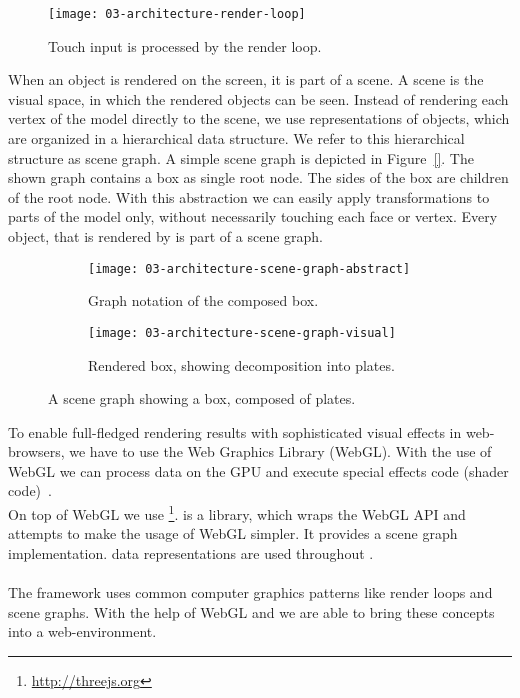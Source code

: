 \documentclass[../ClassicThesis.tex]{subfiles}
\begin{document}
\begin{figure}[h]
  \centering
  \texttt{[image: 03-architecture-render-loop]}
  \caption{Touch input is processed by the render loop.}
  \label{fig:render-loop}
\end{figure}

When an object is rendered on the screen, it is part of a scene. A
scene is the visual space, in which the rendered objects can be seen.
Instead of rendering each vertex of the model directly to the scene,
we use representations of objects, which are organized in a
hierarchical data structure. We refer to this hierarchical structure
as scene graph. A simple scene graph is depicted in Figure~\ref{}. The
shown graph contains a box as single root node. The sides of the box
are children of the root node. With this abstraction we can easily
apply transformations to parts of the model only, without necessarily
touching each face or vertex. Every object, that is rendered by
{\convertify} is part of a scene graph.

\begin{figure}[H]
  \centering
  \begin{subfigure}[b]{0.49\textwidth}
    \centering
    \texttt{[image: 03-architecture-scene-graph-abstract]}
    \caption{Graph notation of the composed box.}
    \label{fig:scene-graph:abstract}
  \end{subfigure}
  \begin{subfigure}[b]{0.49\textwidth}
    \centering
    \texttt{[image: 03-architecture-scene-graph-visual]}
    \caption{Rendered box, showing decomposition into plates.}
    \label{fig:scene-graph:visual}
  \end{subfigure}
  \caption{A scene graph showing a box, composed of plates.}
  \label{fig:scene-graph}
\end{figure}

To enable full-fledged rendering results with sophisticated visual
effects in web-browsers, we have to use the Web Graphics Library
(WebGL). With the use of WebGL we can process data on the GPU and
execute special effects code (shader code)~\cite{mdn-webgl}.
\\
On top of WebGL we use {\threejs}\footnote{\url{http://threejs.org}}.
{\threejs} is a {\javascript} library, which wraps the WebGL API and
attempts to make the usage of WebGL simpler. It provides a scene graph
implementation. {\threejs}
data representations are used throughout {\convertify}.\\
\\
The framework {\convertify} uses common computer graphics patterns
like render loops and scene graphs. With the help of WebGL and
{\threejs} we are able to bring these concepts into a web-environment.
\end{document}

